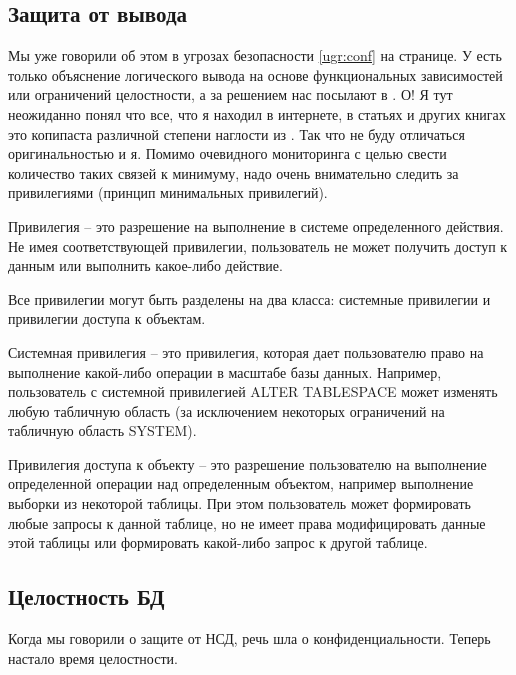 \subsection{Защита от вывода}
Мы уже говорили об этом в угрозах безопасности \ref{ugr:conf} на \pageref{ugr:conf} странице. У \autocite{Ytebov2008} есть только объяснение логического вывода на основе функциональных зависимостей или ограничений целостности, а за решением нас посылают в \autocite{Smirnov2007}. О! Я тут неожиданно понял что все, что я находил в интернете, в статьях и других книгах это копипаста различной степени наглости из \autocite{Smirnov2007}. Так что не буду отличаться оригинальностью и я. Помимо очевидного мониторинга с целью свести количество таких связей к минимуму, надо очень внимательно следить за привилегиями (принцип минимальных привилегий).
\begin{grayquote}
	Привилегия -- это разрешение на выполнение в системе определенного действия. Не имея соответствующей привилегии, пользователь не может получить доступ к данным или выполнить какое-либо действие.
\end{grayquote}

Все привилегии могут быть разделены на два класса: системные привилегии и привилегии доступа к объектам.

\begin{grayquote}
	Системная привилегия -- это привилегия, которая дает пользователю право на выполнение какой-либо операции в масштабе базы данных. Например, пользователь с системной привилегией ALTER TABLESPACE может изменять любую табличную область (за исключением некоторых ограничений на табличную область SYSTEM).

	Привилегия доступа к объекту -- это разрешение пользователю на выполнение определенной операции над определенным объектом, например выполнение выборки из некоторой таблицы.
	При этом пользователь может формировать любые запросы к данной таблице, но не имеет права модифицировать данные этой таблицы или формировать какой-либо запрос к другой таблице.
\end{grayquote}

\subsection{Целостность БД}
Когда мы говорили о защите от НСД, речь шла о конфиденциальности. Теперь настало время целостности.

